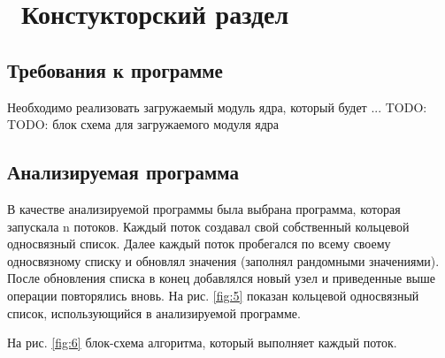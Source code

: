 \chapter{ Констукторский раздел}
\label{cha:design}

\section{Требования к программе}

Необходимо реализовать загружаемый модуль ядра, который будет ... TODO:
TODO: блок схема для загружаемого модуля ядра

\section{Анализируемая программа}

В качестве анализируемой программы  была выбрана программа, 
которая запускала n потоков. 
Каждый поток создавал свой собственный кольцевой односвязный список.
Далее каждый поток пробегался по всему своему односвязному списку 
и обновлял значения (заполнял рандомными значениями).
После обновления списка в конец добавлялся новый узел 
и приведенные выше операции повторялись вновь. 
На рис. \ref{fig:5} показан кольцевой односвязный список, использующийся в анализируемой программе.

\begin{figure}[ht!]
\end{figure}

На рис. \ref{fig:6} блок-схема алгоритма, который выполняет каждый поток. 

